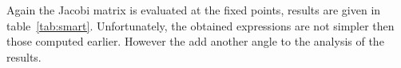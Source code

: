 Again the Jacobi matrix is evaluated at the fixed points, results are given in table~\ref{tab:smart}. Unfortunately, the obtained expressions are not simpler then those computed earlier. However the add another angle to the analysis of the results. 


%
%
%





